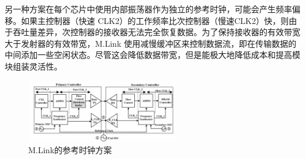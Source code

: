 另一种方案在每个芯片中使用内部振荡器作为独立的参考时钟，可能会产生频率偏移。如果主控制器（快速 CLK2）的工作频率比次控制器（慢速CLK2）快，则由于吞吐量差异，次控制器的接收器无法完全恢复数据。为了保持接收器的有效带宽大于发射器的有效带宽，M.Link 使用减慢缓冲区来控制数据流，即在传输数据的中间添加一些空闲状态。尽管这会降低数据带宽，但是能极大地降低成本和提高模块组装灵活性。

\begin{figure}[htbp]
	\centering
	\includegraphics[width=0.6\textwidth]{img/4-2.png} %
	\caption{M.Link的参考时钟方案 \cite{10848977}}
	\label{fig:example}
\end{figure}